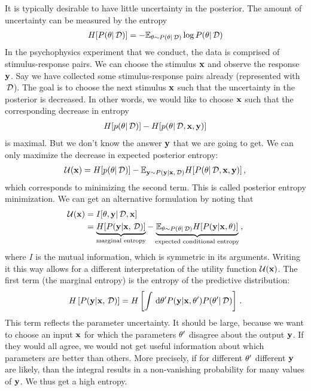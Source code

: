 It is typically desirable to have little uncertainty in the posterior. The amount of uncertainty can be measured by the entropy
\begin{align}
	H[{P(\theta | \,\mathcal{D})}] =
	- \mathbb{E}_{\theta \sim {P(\theta| \,\mathcal{D})}}
	\log {P(\theta| \,\mathcal{D})}
\end{align}
In the psychophysics experiment that we conduct, the data is comprised of stimulus-response pairs. We can choose the stimulus ${\bf x}$ and observe the response ${\bf y}$. Say we have collected some stimulus-response pairs already (represented with $\,\mathcal{D}$). The goal is to choose the next stimulus ${\bf x}$ such that the uncertainty in the posterior is decreased. In other words, we would like to choose ${\bf x}$ such that the corresponding decrease in entropy
\begin{align}
	H[p(\theta | \,\mathcal{D})] - H[p(\theta | \,\mathcal{D}, {\bf x}, {\bf y})]
\end{align}
is maximal. But we don't know the answer ${\bf y}$ that we are going to get. We can only maximize the decrease in expected posterior entropy:
\begin{align}
	\mathcal{U}({\bf x})
	= H[p(\theta | \,\mathcal{D})]
	- \mathbb{E}_{{\bf y} \sim {P({\bf y}| {\bf x}, \,\mathcal{D})}} H[{P(\theta | \,\mathcal{D}, {\bf x}, {\bf y})}] \,,
\end{align}
which corresponds to minimizing the second term. This is called posterior entropy minimization.
We can get an alternative formulation by noting that
\begin{align}
	\mathcal{U}({\bf x})
	&= I[\theta, {\bf y} | \,\mathcal{D}, {\bf x}] \\
	&=
	\underbrace{
	H[{P({\bf y} | {\bf x}, \,\mathcal{D})}]}_{\text{marginal entropy}}
	-
	\underbrace{
	\mathbb{E}_{\theta \sim {P(\theta| \,\mathcal{D})}} H[{P({\bf y} | {\bf x}, \theta)}]}_{\text{expected conditional entropy}}
	\,,
\end{align}
where $I$ is the mutual information, which is symmetric in its arguments. Writing it this way allows for a different interpretation of the utility function $\mathcal{U}({\bf x})$.
The first term (the marginal entropy) is the entropy of the predictive distribution:
\begin{align}
	H\left[{P({\bf y} | {\bf x}, \,\mathcal{D})}\right] = H\left[\int \,\mathrm{d} \theta' {P({\bf y} | {\bf x}, \theta')} {P(\theta' | \,\mathcal{D})}\right] \,.
\end{align}
This term reflects the parameter uncertainty.
It should be large, because we want to choose an input ${\bf x}$ for which the parameters $\theta'$ disagree about the output ${\bf y}$. If they would all agree, we would not get useful information about which parameters are better than others.
More precisely, if for different $\theta'$ different ${\bf y}$ are likely, than the integral results in a non-vanishing probability for many values of ${\bf y}$. We thus get a high entropy.


